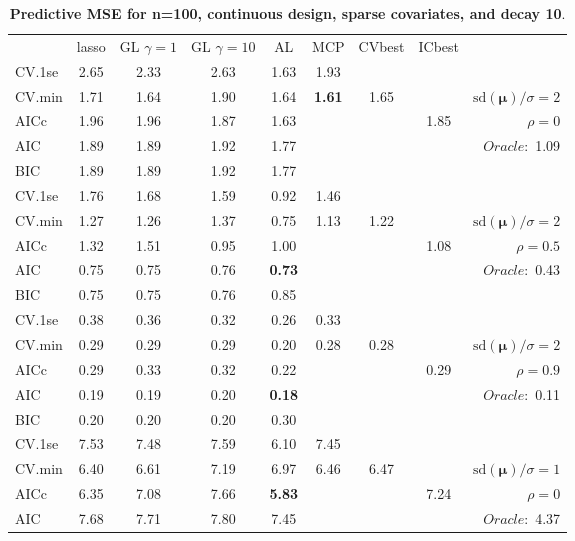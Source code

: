 \begin{table}\vspace{-.5cm}
\caption[l]{ { \bf Predictive MSE for n=100, continuous design, 
sparse covariates, and  decay  10}.}
\vspace{-.5cm}
\footnotesize{}
\begin{center}
\begin{tabular}{l*{7}{c}|r}
 & lasso & GL $\gamma=1$ & GL $\gamma=10$ & AL & MCP  & CVbest & ICbest  \\
\cline{1-9}
CV.1se & 2.65 & 2.33 & 2.63 & 1.63 & 1.93 & & & \\
CV.min & 1.71 & 1.64 & 1.90 & 1.64 & {\bf 1.61} & 1.65 & & $\mathrm{sd}(\mathbf{\mu})/\sigma=2$ \\
AICc & 1.96 & 1.96 & 1.87 & 1.63 & & & 1.85 &  $\rho=0$ \\
AIC & 1.89 & 1.89 & 1.92 & 1.77 & & & &  \multirow{2}{*}{$Oracle: $ 1.09} \\
BIC & 1.89 & 1.89 & 1.92 & 1.77 & & & &  \\
 \hline 
CV.1se & 1.76 & 1.68 & 1.59 & 0.92 & 1.46 & & & \\
CV.min & 1.27 & 1.26 & 1.37 & 0.75 & 1.13 & 1.22 & & $\mathrm{sd}(\mathbf{\mu})/\sigma=2$ \\
AICc & 1.32 & 1.51 & 0.95 & 1.00 & & & 1.08 &  $\rho=0.5$ \\
AIC & 0.75 & 0.75 & 0.76 & {\bf 0.73} & & & &  \multirow{2}{*}{$Oracle: $ 0.43} \\
BIC & 0.75 & 0.75 & 0.76 & 0.85 & & & &  \\
 \hline 
CV.1se & 0.38 & 0.36 & 0.32 & 0.26 & 0.33 & & & \\
CV.min & 0.29 & 0.29 & 0.29 & 0.20 & 0.28 & 0.28 & & $\mathrm{sd}(\mathbf{\mu})/\sigma=2$ \\
AICc & 0.29 & 0.33 & 0.32 & 0.22 & & & 0.29 &  $\rho=0.9$ \\
AIC & 0.19 & 0.19 & 0.20 & {\bf 0.18} & & & &  \multirow{2}{*}{$Oracle: $ 0.11} \\
BIC & 0.20 & 0.20 & 0.20 & 0.30 & & & &  \\
 \hline 
CV.1se & 7.53 & 7.48 & 7.59 & 6.10 & 7.45 & & & \\
CV.min & 6.40 & 6.61 & 7.19 & 6.97 & 6.46 & 6.47 & & $\mathrm{sd}(\mathbf{\mu})/\sigma=1$ \\
AICc & 6.35 & 7.08 & 7.66 & {\bf 5.83} & & & 7.24 &  $\rho=0$ \\
AIC & 7.68 & 7.71 & 7.80 & 7.45 & & & &  \multirow{2}{*}{$Oracle: $ 4.37} \\

\end{tabular}
\end{center}
\end{table}
